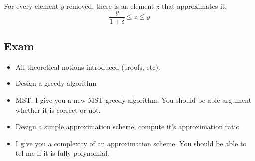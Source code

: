 For every element $y$ removed, there is an element $z$ that approximates
it: $$\frac{y}{1+\delta} \leq z \leq y$$




\subsection{Exam}
\begin{itemize}
    \item All theoretical notions introduced (proofs, etc).
    \item Design a greedy algorithm
    \item MST: I give you a new MST greedy algorithm. You
        should be able argument whether it is correct or not.
    \item Design a simple approximation scheme, compute it’s
        approximation ratio
    \item I give you a complexity of an approximation scheme.
        You should be able to tel me if it is fully polynomial.
\end{itemize}

